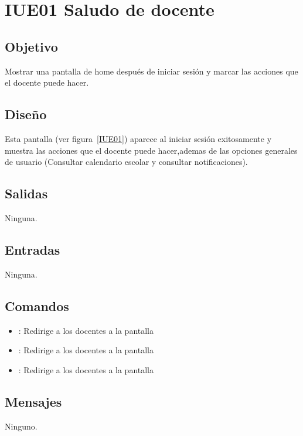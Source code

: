 \section{IUE01 Saludo de docente}

\subsection{Objetivo}
	Mostrar una pantalla de home después de iniciar sesión y marcar las acciones que el docente puede hacer.

\subsection{Diseño}
	Esta pantalla  (ver figura~\ref{IUE01}) aparece al iniciar sesión exitosamente y muestra las acciones que el docente puede hacer,ademas de las opciones generales de usuario (Consultar calendario escolar y consultar notificaciones). 


\subsection{Salidas}

	Ninguna.

\subsection{Entradas}
	Ninguna.

\subsection{Comandos}
\begin{itemize}
	\item {}: Redirige a los docentes a la pantalla 
	\item {}: Redirige a los docentes a la pantalla 
	\item {}: Redirige a los docentes a la pantalla 
	
\end{itemize}

\subsection{Mensajes}

\begin{Citemize}
	\item Ninguno.
\end{Citemize}

